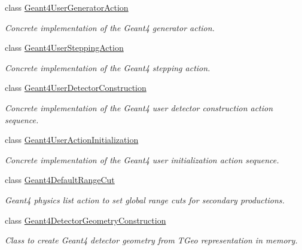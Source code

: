 \begin{DoxyCompactItemize}
class \hyperlink{class_d_d4hep_1_1_simulation_1_1_geant4_user_generator_action}{Geant4UserGeneratorAction}
\begin{DoxyCompactList}\small\item\em Concrete implementation of the Geant4 generator action. \item\end{DoxyCompactList}\item 
class \hyperlink{class_d_d4hep_1_1_simulation_1_1_geant4_user_stepping_action}{Geant4UserSteppingAction}
\begin{DoxyCompactList}\small\item\em Concrete implementation of the Geant4 stepping action. \item\end{DoxyCompactList}\item 
class \hyperlink{class_d_d4hep_1_1_simulation_1_1_geant4_user_detector_construction}{Geant4UserDetectorConstruction}
\begin{DoxyCompactList}\small\item\em Concrete implementation of the Geant4 user detector construction action sequence. \item\end{DoxyCompactList}\item 
class \hyperlink{class_d_d4hep_1_1_simulation_1_1_geant4_user_action_initialization}{Geant4UserActionInitialization}
\begin{DoxyCompactList}\small\item\em Concrete implementation of the Geant4 user initialization action sequence. \item\end{DoxyCompactList}\item 
class \hyperlink{class_d_d4hep_1_1_simulation_1_1_geant4_default_range_cut}{Geant4DefaultRangeCut}
\begin{DoxyCompactList}\small\item\em Geant4 physics list action to set global range cuts for secondary productions. \item\end{DoxyCompactList}\item 
class \hyperlink{class_d_d4hep_1_1_simulation_1_1_geant4_detector_geometry_construction}{Geant4DetectorGeometryConstruction}
\begin{DoxyCompactList}\small\item\em Class to create Geant4 detector geometry from TGeo representation in memory. \item\end{DoxyCompactList}\item 

\end{DoxyCompactItemize}

